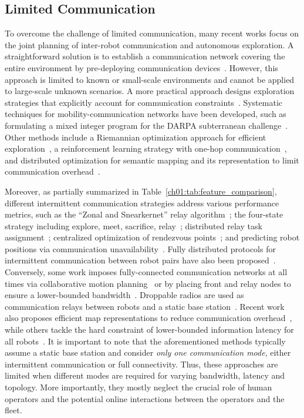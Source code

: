 \subsection{Limited Communication}
To overcome the challenge of limited communication, many recent works
focus on the joint planning of inter-robot communication and autonomous
exploration. A straightforward solution is to establish a communication
network covering the entire environment by pre-deploying communication
devices~\cite{bi2023cure, yu2021smmr}. However, this approach is limited
to known or small-scale environments and cannot be applied to large-scale
unknown scenarios. A more practical approach designs exploration
strategies that explicitly account for communication
constraints~\cite{pei2013connectivity}.
Systematic techniques for mobility-communication networks have been
developed, such as formulating a mixed integer program for the DARPA
subterranean challenge~\cite{klaesson2020planning}. Other methods include
a Riemannian optimization approach for efficient exploration~\cite{asgharivaskasi2025riemannian},
a reinforcement learning strategy with one-hop communication~\cite{wang2025multirobot,tan20254cnetdiffusionapproachmap},
and distributed optimization for semantic mapping and its representation
to limit communication overhead~\cite{asgharivaskasi2025riemannian}.

Moreover, as partially summarized in Table~\ref{ch01:tab:feature_comparison},
different intermittent communication strategies address various performance
metrics, such as the ``Zonal and Snearkernet'' relay algorithm~\cite{vaquero2018approach};
the four-state strategy including explore, meet, sacrifice, relay~\cite{cesare2015multi};
distributed relay task assignment~\cite{marchukov2019fast}; centralized
optimization of rendezvous points~\cite{gao2022meeting}; and predicting robot
positions via communication unavailability~\cite{schack2024sound}. Fully
distributed protocols for intermittent communication between robot pairs have
also been proposed~\cite{kantaros2019temporal}. Conversely,
some work imposes fully-connected communication networks at all times
via collaborative motion planning~\cite{zavlanos2011graph}
or by placing front and relay nodes to ensure a lower-bounded
bandwidth~\cite{marcotte2020optimizing,xia2023relink}.
Droppable radios are used as communication relays between robots and
a static base station~\cite{saboia2022achord,riley2023fielded}. Recent work also
proposes efficient map representations to reduce communication overhead~\cite{zhang2022mr},
while others tackle the hard constraint of lower-bounded information
latency for all robots~\cite{tian2024ihero}.
It is important to note that the aforementioned methods typically assume a
static base station and consider \emph{only one communication mode}, either
intermittent communication or full connectivity. Thus, these
approaches are limited when different modes are required for
varying bandwidth, latency and topology. More importantly, they mostly
neglect the crucial role of human operators and the potential online
interactions between the operators and the fleet.

